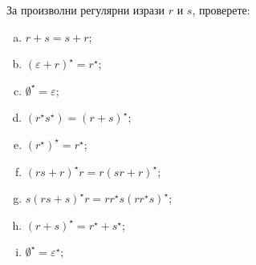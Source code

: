 \begin{problem}
  За произволни регулярни изрази $r$ и $s$, 
  проверете:
  \begin{enumerate}[a)]
  \item 
    $r+s = s + r$;
  \item
    $(\varepsilon + r)^\star = r^\star$;
  \item
    $\emptyset^\star = \varepsilon$;
  \item
    $(r^\star s^\star) = (r+s)^\star$;
  \item
    $(r^\star)^\star = r^\star$;
  \item
    $(rs + r)^\star r = r(sr+r)^\star$;
  \item
    $s(rs+s)^\star r = rr^\star s(rr^\star s)^\star$;
  \item
    $(r+s)^\star = r^\star + s^\star$;
  \item
    $\emptyset^\star = \varepsilon^\star$;
  \end{enumerate}
\end{problem}

